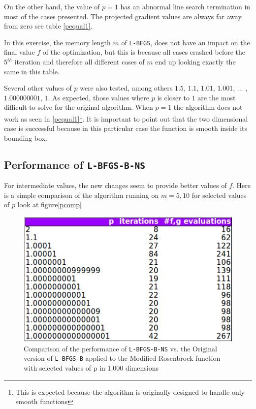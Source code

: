 On the other hand, the value of $p = 1$ has an abnormal line search termination in most of the cases presented. The projected gradient values are always far away from zero see table \eqref{pequal1}. 

In this exercise, the memory length $m$ of \texttt{L-BFGS}, does not have an impact on the final value $f$ of the optimization, but this is because all cases crashed before the $5^{th}$ iteration and therefore all different cases of $m$ end up looking exactly the same in this table.

Several other values of $p$ were also tested, among others $1.5$, $1.1$, $1.01$, $1.001$, ... , $1.000000001$, $1$. As expected, those values where $p$ is closer to $1$ are the most difficult to solve for the original algorithm. When $p=1$ the algorithm does not work as seen in \eqref{pequal1}\footnote{This is expected because the algorithm is originally designed to handle only smooth functions}. It is important to point out that the two dimensional case is successful because in this particular case the function is smooth inside its bounding box.

\subsection{Performance of \texttt{L-BFGS-B-NS}}

For intermediate values, the new changes seem to provide better values of $f$. Here is a simple comparison of the algorithm running on $m = 5,10$ for selected values of $p$ look at figure\eqref{pcomp}

\begin{figure}
\begin{center}
\includegraphics[scale=0.75]{Figures/ComparisonNewOld.png}
\caption[Comparison of selected values of the Modified Rosenbrock function]{Comparison of the performance of \texttt{L-BFGS-B-NS} vs. the Original version of \texttt{L-BFGS-B} applied to the Modified Rosenbrock function with selected values of p in 1.000 dimensions}
\label{pcomp}
\end{center}
\end{figure}

